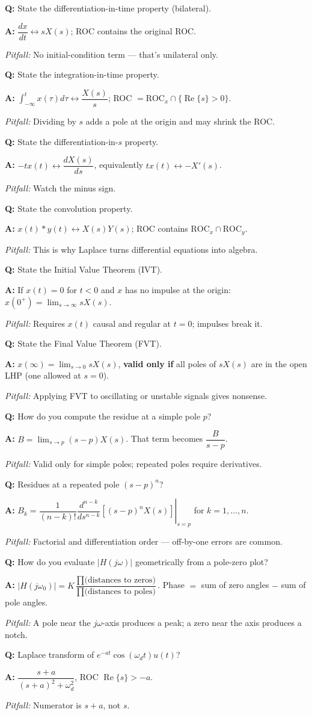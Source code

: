 \documentclass[11pt]{article}
\newcommand{\Q}[1]{\par\medskip\noindent\textbf{Q:} #1}
\newcommand{\A}[1]{\par\noindent\textbf{A:} #1}
\newcommand{\Pit}[1]{\par\noindent\textit{Pitfall:} #1}
\begin{document}
\Q{State the differentiation-in-time property (bilateral).}
\A{$\dfrac{dx}{dt} \leftrightarrow sX(s)$; ROC contains the original ROC.}
\Pit{No initial-condition term --- that's unilateral only.}

\Q{State the integration-in-time property.}
\A{$\displaystyle\int_{-\infty}^{t} x(\tau)d\tau \leftrightarrow \dfrac{X(s)}{s}$; ROC $= \text{ROC}_x \cap \{\operatorname{Re}\{s\}>0\}$.}
\Pit{Dividing by $s$ adds a pole at the origin and may shrink the ROC.}

\Q{State the differentiation-in-$s$ property.}
\A{$-tx(t) \leftrightarrow \dfrac{dX(s)}{ds}$, equivalently $tx(t) \leftrightarrow -X'(s)$.}
\Pit{Watch the minus sign.}

\Q{State the convolution property.}
\A{$x(t)*y(t) \leftrightarrow X(s)Y(s)$; ROC contains $\text{ROC}_x\cap\text{ROC}_y$.}
\Pit{This is why Laplace turns differential equations into algebra.}

\Q{State the Initial Value Theorem (IVT).}
\A{If $x(t)=0$ for $t<0$ and $x$ has no impulse at the origin: $x(0^+) = \lim_{s\to\infty} sX(s)$.}
\Pit{Requires $x(t)$ causal and regular at $t=0$; impulses break it.}

\Q{State the Final Value Theorem (FVT).}
\A{$x(\infty) = \lim_{s\to 0} sX(s)$, \textbf{valid only if} all poles of $sX(s)$ are in the open LHP (one allowed at $s=0$).}
\Pit{Applying FVT to oscillating or unstable signals gives nonsense.}

\Q{How do you compute the residue at a simple pole $p$?}
\A{$B = \lim_{s\to p}(s-p)X(s)$. That term becomes $\dfrac{B}{s-p}$.}
\Pit{Valid only for simple poles; repeated poles require derivatives.}

\Q{Residues at a repeated pole $(s-p)^n$?}
\A{$B_k = \dfrac{1}{(n-k)!}\left.\dfrac{d^{n-k}}{ds^{n-k}}\left[(s-p)^n X(s)\right]\right|_{s=p}$ for $k=1,\dots,n$.}
\Pit{Factorial and differentiation order --- off-by-one errors are common.}

\Q{How do you evaluate $|H(j\omega)|$ geometrically from a pole-zero plot?}
\A{$|H(j\omega_0)| = K\dfrac{\prod \text{(distances to zeros)}}{\prod \text{(distances to poles)}}$. Phase $=$ sum of zero angles $-$ sum of pole angles.}
\Pit{A pole near the $j\omega$-axis produces a peak; a zero near the axis produces a notch.}

\Q{Laplace transform of $e^{-at}\cos(\omega_d t)u(t)$?}
\A{$\dfrac{s+a}{(s+a)^2+\omega_d^2}$, ROC $\operatorname{Re}\{s\}>-a$.}
\Pit{Numerator is $s+a$, not $s$.}

\end{document}
